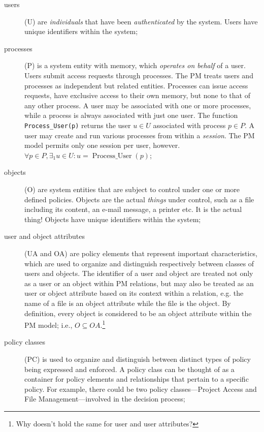 \documentclass[12pt,a4paper,titlepage]{book}
\begin{document}
	\begin{description}
		\item[users] (U) are \emph{individuals} that have been \emph{authenticated} by the system. Users have unique identifiers within the system;
		
		\item[processes] (P) is a system entity	with memory, which \emph{operates on behalf} of a user. Users submit access requests through processes. The PM treats users and processes as independent but related entities. Processes can issue access requests, have exclusive access to their own memory, but none to that of any other process. A user may be associated with one or more processes, while a process is always associated with just one user. The function \lstinline|Process_User(p)| returns the user $u \in U$ associated with process $p \in P$. A user may create and run various processes from within a \emph{session}. The PM model permits only one session per user, however.
		$\forall p \in P, \exists _1 u \in U: u = \operatorname{Process\_User}(p)$;
		
		\item[objects] (O) are system entities that are subject to control under one or more defined policies. Objects are the actual \emph{things} under control, such as a file including its content, an e-mail message, a printer etc. It is the actual thing! Objects have unique identifiers within the system;
		
		\item[user and object attributes] (UA and OA) are policy elements that represent important characteristics, which are used to organize and distinguish respectively between classes of users and objects. The identifier of a user and object are treated not
		only as a user or an object within PM relations, but may also be treated as an user or object attribute based on its context within a relation, e.g. the name of a file is an object attribute while the file is the object. By definition, every object is considered to be an object attribute within the PM model; i.e., $O \subseteq OA$.\footnote{Why doesn't hold the same for user and user attributes?}
		
		\item[policy classes] (PC) is used to organize and distinguish between distinct types of policy being expressed and enforced. A policy class can be thought of as a container for policy elements and relationships that pertain to a specific policy. For example, there could be two policy classes---Project Access and File Management---involved in the decision process;
		

\end{description}
\end{document}
